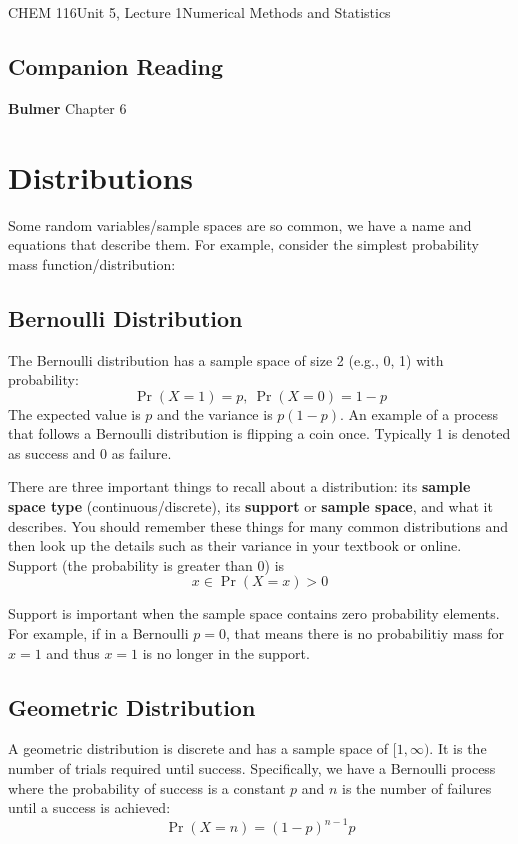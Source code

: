\documentclass{article}
\begin{document}
\begin{tdoc}{CHEM 116}{Unit 5, Lecture 1}{Numerical Methods and Statistics}

  \subsection*{Companion Reading}
  \textbf{Bulmer} Chapter 6

\section{Distributions}

Some random variables/sample spaces are so common, we have a name and
equations that describe them. For example, consider the simplest
probability mass function/distribution:

\subsection{Bernoulli Distribution}

The Bernoulli distribution has a sample space of size 2 (e.g., 0, 1) with probability:
\begin{equation}
\Pr(X = 1) = p,\: \Pr(X = 0) = 1 - p
\end{equation}
The expected value is $p$ and the variance is $p(1-p)$. An example of
a process that follows a Bernoulli distribution is flipping a coin
once. Typically 1 is denoted as success and 0 as failure.

There are three important things to recall about a distribution: its
{\bf sample space type} (continuous/discrete), its {\bf support} or
{\bf sample space}, and what it describes. You should remember these
things for many common distributions and then look up the details such
as their variance in your textbook or online. Support (the probability
is greater than $0$) is
\begin{equation}
x \in \Pr(X = x) > 0
\end{equation}

Support is important when the sample space contains zero probability
elements. For example, if in a Bernoulli $p = 0$, that means there is no probabilitiy mass for $x = 1$ and thus
$x = 1$ is no longer in the support.

\subsection{Geometric Distribution}
A geometric distribution is discrete and has a sample space of
$[1,\infty)$. It is the number of trials required until
  success. Specifically, we have a Bernoulli process where the
  probability of success is a constant $p$ and $n$ is the number of
  failures until a success is achieved:
\begin{equation}
\Pr(X = n) = (1 - p)^{n - 1}p
\end{equation}


\end{tdoc}
\end{document}
